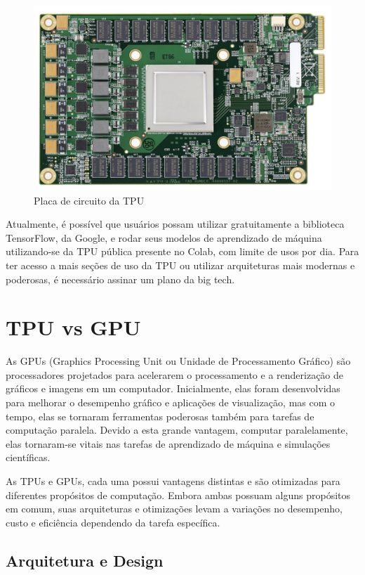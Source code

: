 \documentclass{report}
\begin{document}
\begin{figure}[h]
	\includegraphics[scale=0.7]{circuit-board}
	\centering
	\caption{Placa de circuito da TPU}
\end{figure}

Atualmente, é possível que usuários possam utilizar gratuitamente a biblioteca TensorFlow, da Google, e rodar seus modelos de aprendizado de máquina utilizando-se da TPU pública presente no Colab, com limite de usos por dia. Para ter acesso a mais seções de uso da TPU ou utilizar arquiteturas mais modernas e poderosas, é necessário assinar um plano da big tech.

\chapter{TPU vs GPU}

As GPUs (Graphics Processing Unit ou Unidade de Processamento Gráfico) são processadores projetados para acelerarem o processamento e a renderização de gráficos e imagens em um computador. Inicialmente, elas foram desenvolvidas para melhorar o desempenho gráfico e aplicações de visualização, mas com o tempo, elas se tornaram ferramentas poderosas também para tarefas de computação paralela. Devido a esta grande vantagem, computar paralelamente, elas tornaram-se vitais nas tarefas de aprendizado de máquina e simulações científicas.

As TPUs e GPUs, cada uma possui vantagens distintas e são otimizadas para diferentes propósitos de computação. Embora ambas possuam alguns propósitos em comum, suas arquiteturas e otimizações levam a variações no desempenho, custo e eficiência dependendo da tarefa específica.

\section{Arquitetura e Design}
\end{document}
